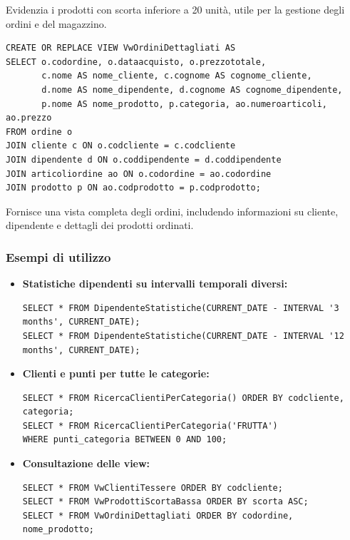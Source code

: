 \documentclass[a4paper,12pt]{article}
\begin{document}
\noindent
Evidenzia i prodotti con scorta inferiore a 20 unità, utile per la gestione degli ordini e del magazzino.  

\begin{lstlisting}[style=sqlstyle]
CREATE OR REPLACE VIEW VwOrdiniDettagliati AS
SELECT o.codordine, o.dataacquisto, o.prezzototale,
       c.nome AS nome_cliente, c.cognome AS cognome_cliente,
       d.nome AS nome_dipendente, d.cognome AS cognome_dipendente,
       p.nome AS nome_prodotto, p.categoria, ao.numeroarticoli, ao.prezzo
FROM ordine o
JOIN cliente c ON o.codcliente = c.codcliente
JOIN dipendente d ON o.coddipendente = d.coddipendente
JOIN articoliordine ao ON o.codordine = ao.codordine
JOIN prodotto p ON ao.codprodotto = p.codprodotto;
\end{lstlisting}

\noindent
Fornisce una vista completa degli ordini, includendo informazioni su cliente, dipendente e dettagli dei prodotti ordinati.  

\subsubsection{Esempi di utilizzo}

\begin{itemize}
    \item \textbf{Statistiche dipendenti su intervalli temporali diversi:}
\begin{lstlisting}[style=sqlstyle]
SELECT * FROM DipendenteStatistiche(CURRENT_DATE - INTERVAL '3 months', CURRENT_DATE);
SELECT * FROM DipendenteStatistiche(CURRENT_DATE - INTERVAL '12 months', CURRENT_DATE);
\end{lstlisting}

    \item \textbf{Clienti e punti per tutte le categorie:}
\begin{lstlisting}[style=sqlstyle]
SELECT * FROM RicercaClientiPerCategoria() ORDER BY codcliente, categoria;
SELECT * FROM RicercaClientiPerCategoria('FRUTTA')
WHERE punti_categoria BETWEEN 0 AND 100;
\end{lstlisting}

    \item \textbf{Consultazione delle view:}
\begin{lstlisting}[style=sqlstyle]
SELECT * FROM VwClientiTessere ORDER BY codcliente;
SELECT * FROM VwProdottiScortaBassa ORDER BY scorta ASC;
SELECT * FROM VwOrdiniDettagliati ORDER BY codordine, nome_prodotto;
\end{lstlisting}
\end{itemize}
\end{document}
